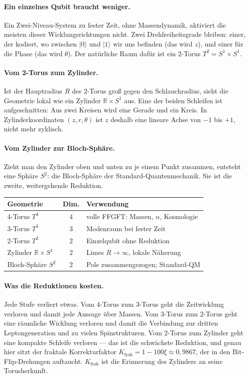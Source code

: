 \paragraph{Ein einzelnes Qubit braucht weniger.} Ein Zwei-Niveau-System
zu fester Zeit, ohne Massendynamik, aktiviert die meisten dieser
Wicklungsrichtungen nicht. Zwei Drehfreiheitsgrade bleiben: einer, der
kodiert, wo zwischen $|0\rangle$ und $|1\rangle$ wir uns befinden (das
wird $z$), und einer für die Phase (das wird $\theta$). Der natürliche
Raum dafür ist ein 2-Torus $T^2 = S^1\times S^1$.

\paragraph{Vom 2-Torus zum Zylinder.} Ist der Hauptradius $R$ des
2-Torus groß gegen den Schlauchradius, sieht die Geometrie lokal wie ein
Zylinder $\mathbb{R}\times S^1$ aus. Eine der beiden Schleifen ist
aufgeschnitten: Aus zwei Kreisen wird eine Gerade und ein Kreis. In
Zylinderkoordinaten $(z,r,\theta)$ ist $z$ deshalb eine lineare Achse
von $-1$ bis $+1$, nicht mehr zyklisch.

\paragraph{Vom Zylinder zur Bloch-Sphäre.} Zieht man den Zylinder oben
und unten zu je einem Punkt zusammen, entsteht eine Sphäre $S^2$: die
Bloch-Sphäre der Standard-Quantenmechanik. Sie ist die zweite,
weitergehende Reduktion.

\begin{center}
\small\renewcommand{\arraystretch}{1.3}
\begin{tabular}{p{2.9cm}cp{3.6cm}}
\toprule
\textbf{Geometrie} & \textbf{Dim.} & \textbf{Verwendung} \\
\midrule
4-Torus $T^4$ & 4 & volle FFGFT: Massen, $\alpha$, Kosmologie \\
3-Torus $T^3$ & 3 & Modenraum bei fester Zeit \\
2-Torus $T^2$ & 2 & Einzelqubit ohne Reduktion \\
Zylinder $\mathbb{R}\times S^1$ & 2 & Limes $R\to\infty$, lokale Näherung \\
Bloch-Sphäre $S^2$ & 2 & Pole zusammengezogen; Standard-QM \\
\bottomrule
\end{tabular}
\end{center}

\paragraph{Was die Reduktionen kosten.} Jede Stufe verliert etwas. Vom
4-Torus zum 3-Torus geht die Zeitwicklung verloren und damit jede
Aussage über Massen. Vom 3-Torus zum 2-Torus geht eine räumliche
Wicklung verloren und damit die Verbindung zur dritten Leptongeneration
und zu vielen Spinstrukturen. Vom 2-Torus zum Zylinder geht eine
kompakte Schleife verloren --- das ist die schwächste Reduktion, und
genau hier sitzt der fraktale Korrekturfaktor
$K_{\mathrm{frak}} = 1-100\xi\approx0{,}9867$, der in den
Bit-Flip-Drehungen auftaucht. $K_{\mathrm{frak}}$ ist die Erinnerung des
Zylinders an seine Torusherkunft.

